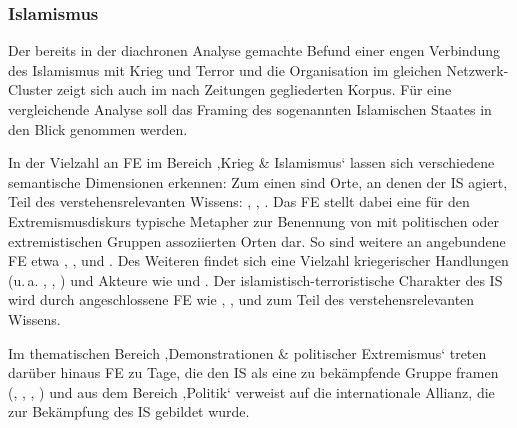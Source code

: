 \subsubsection{Islamismus}\label{islamismus-8}

Der bereits in der diachronen Analyse gemachte Befund einer engen Verbindung des Islamismus mit Krieg und Terror und die Organisation im gleichen Netzwerk-Cluster zeigt sich auch im nach Zeitungen gegliederten Korpus. Für eine vergleichende Analyse soll das Framing des sogenannten Islamischen Staates in den Blick genommen werden.

In der Vielzahl an FE im Bereich ‚Krieg \& Islamismus` lassen sich verschiedene semantische Dimensionen erkennen: Zum einen sind Orte, an denen der IS agiert, Teil des verstehensrelevanten Wissens: , , . Das FE  stellt dabei eine für den Extremismusdiskurs typische Metapher zur Benennung von mit politischen oder extremistischen Gruppen assoziierten Orten dar. So sind weitere an  angebundene FE etwa , ,  und . Des Weiteren findet sich eine Vielzahl kriegerischer Handlungen (u.\,a. , , ) und Akteure wie  und . Der islamistisch-terroristische Charakter des IS wird durch angeschlossene FE wie , ,  und  zum Teil des verstehensrelevanten Wissens.

Im thematischen Bereich ‚Demonstrationen \& politischer Extremismus` treten darüber hinaus FE zu Tage, die den IS als eine zu bekämpfende Gruppe framen (, , , ) und  aus dem Bereich ‚Politik` verweist auf die internationale Allianz, die zur Bekämpfung des IS gebildet wurde.

